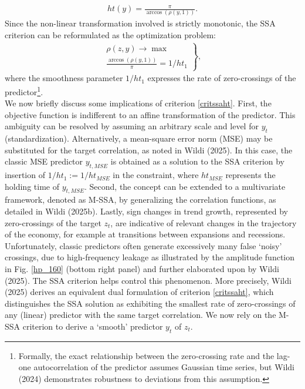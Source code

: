 \documentclass[a4paper]{article}
\begin{document}
\begin{eqnarray*}\label{ht}
ht(y)=\frac{\pi}{\arccos(\rho(y,1))}.
\end{eqnarray*}
Since the non-linear transformation involved is strictly monotonic, the SSA criterion can be reformulated as the optimization problem:
\begin{eqnarray}\label{critssaht}
\left.\begin{array}{c}\rho(z,y)\to\max\\
\frac{\arccos(\rho(y,1))}{\pi}=1/ht_1\end{array}\right\},
\end{eqnarray}
where the smoothness parameter $1/ht_1$ expresses the rate of zero-crossings of the predictor\footnote{Formally, the exact relationship between the zero-crossing rate and the lag-one autocorrelation of the predictor assumes Gaussian time series, but Wildi (2024) demonstrates robustness to deviations from this assumption.}. \\


We now briefly discuss some implications of criterion \eqref{critssaht}. First, the objective function is indifferent to an affine transformation of the predictor. This ambiguity can be resolved by assuming an arbitrary scale and level for $y_t$ (standardization). Alternatively, a mean-square error norm (MSE) may be substituted for the target correlation, as noted in Wildi (2025). In this case, the classic MSE predictor $y_{t,MSE}$ is obtained as a solution to the SSA criterion by insertion of $1/ht_1:=1/ht_{MSE}$ in the constraint, where $ht_{MSE}$ represents the holding time of $y_{t,MSE}$. %
Second, the concept can be extended to a multivariate framework, denoted as M-SSA, by generalizing the correlation functions, as detailed in Wildi (2025b). Lastly, sign changes in trend growth, represented by zero-crossings of the target $z_t$, are indicative of relevant changes in the trajectory of the economy, for example at transitions between expansions and recessions. Unfortunately, classic predictors often generate excessively many false `noisy' crossings, due to high-frequency leakage as illustrated by the amplitude function in Fig. \eqref{hp_160} (bottom right panel) and further elaborated upon by Wildi (2025). The SSA criterion helps control this phenomenon. More precisely, Wildi (2025) derives an equivalent dual formulation of criterion \eqref{critssaht}, which distinguishes the SSA solution as exhibiting the smallest rate of zero-crossings of any (linear) predictor with the same target correlation. We now rely on the M-SSA criterion to derive a `smooth' predictor $y_t$ of $z_t$. %
\end{document}

